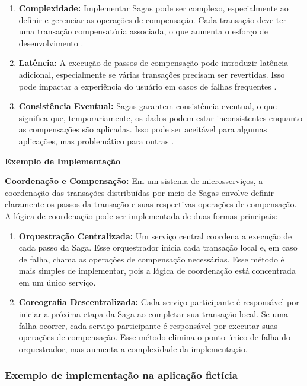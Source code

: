 \begin{enumerate}
    \item \textbf{Complexidade:} Implementar Sagas pode ser complexo, especialmente ao definir e gerenciar as operações de compensação. Cada transação deve ter uma transação compensatória associada, o que aumenta o esforço de desenvolvimento \cite{richardson2018}.
    \item \textbf{Latência:} A execução de passos de compensação pode introduzir latência adicional, especialmente se várias transações precisam ser revertidas. Isso pode impactar a experiência do usuário em casos de falhas frequentes \cite{fowler2011}.
    \item \textbf{Consistência Eventual:} Sagas garantem consistência eventual, o que significa que, temporariamente, os dados podem estar inconsistentes enquanto as compensações são aplicadas. Isso pode ser aceitável para algumas aplicações, mas problemático para outras \cite{garcia-molina1987}.
\end{enumerate}

\textbf{Exemplo de Implementação}

\textbf{Coordenação e Compensação:} Em um sistema de microsserviços, a coordenação das transações distribuídas por meio de Sagas envolve definir claramente os passos da transação e suas respectivas operações de compensação. A lógica de coordenação pode ser implementada de duas formas principais:

\begin{enumerate}
    \item \textbf{Orquestração Centralizada:} Um serviço central coordena a execução de cada passo da Saga. Esse orquestrador inicia cada transação local e, em caso de falha, chama as operações de compensação necessárias. Esse método é mais simples de implementar, pois a lógica de coordenação está concentrada em um único serviço.
    \item \textbf{Coreografia Descentralizada:} Cada serviço participante é responsável por iniciar a próxima etapa da Saga ao completar sua transação local. Se uma falha ocorrer, cada serviço participante é responsável por executar suas operações de compensação. Esse método elimina o ponto único de falha do orquestrador, mas aumenta a complexidade da implementação.
\end{enumerate}

\subsubsection{Exemplo de implementação na aplicação fictícia}

